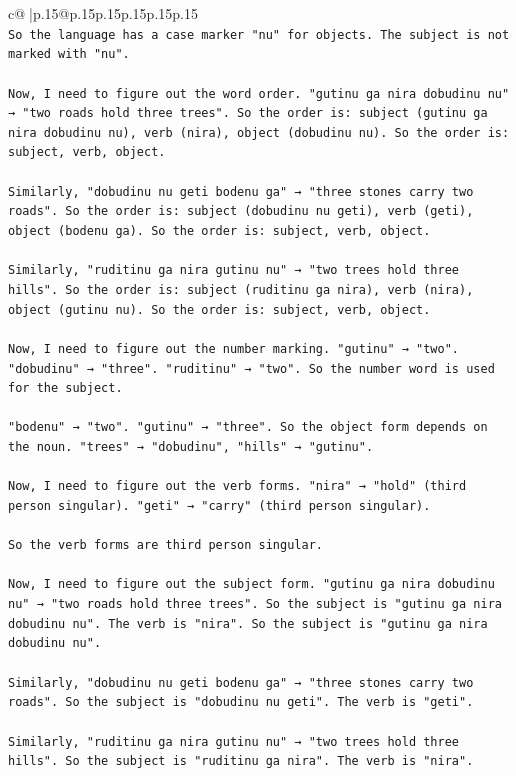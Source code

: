 \documentclass{article}
\begin{document}
{\begin{supertabular}{c@{$\;$}|p{.15\linewidth}@{}p{.15\linewidth}p{.15\linewidth}p{.15\linewidth}p{.15\linewidth}p{.15\linewidth}}
{{{\\ 
\texttt{So the language has a case marker "nu" for objects. The subject is not marked with "nu".} \\
\\ 
\texttt{Now, I need to figure out the word order. "gutinu ga nira dobudinu nu" → "two roads hold three trees". So the order is: subject (gutinu ga nira dobudinu nu), verb (nira), object (dobudinu nu). So the order is: subject, verb, object.} \\
\\ 
\texttt{Similarly, "dobudinu nu geti bodenu ga" → "three stones carry two roads". So the order is: subject (dobudinu nu geti), verb (geti), object (bodenu ga). So the order is: subject, verb, object.} \\
\\ 
\texttt{Similarly, "ruditinu ga nira gutinu nu" → "two trees hold three hills". So the order is: subject (ruditinu ga nira), verb (nira), object (gutinu nu). So the order is: subject, verb, object.} \\
\\ 
\texttt{Now, I need to figure out the number marking. "gutinu" → "two". "dobudinu" → "three". "ruditinu" → "two". So the number word is used for the subject.} \\
\\ 
\texttt{"bodenu" → "two". "gutinu" → "three". So the object form depends on the noun. "trees" → "dobudinu", "hills" → "gutinu".} \\
\\ 
\texttt{Now, I need to figure out the verb forms. "nira" → "hold" (third person singular). "geti" → "carry" (third person singular).} \\
\\ 
\texttt{So the verb forms are third person singular.} \\
\\ 
\texttt{Now, I need to figure out the subject form. "gutinu ga nira dobudinu nu" → "two roads hold three trees". So the subject is "gutinu ga nira dobudinu nu". The verb is "nira". So the subject is "gutinu ga nira dobudinu nu".} \\
\\ 
\texttt{Similarly, "dobudinu nu geti bodenu ga" → "three stones carry two roads". So the subject is "dobudinu nu geti". The verb is "geti".} \\
\\ 
\texttt{Similarly, "ruditinu ga nira gutinu nu" → "two trees hold three hills". So the subject is "ruditinu ga nira". The verb is "nira".} \\
}}}
\end{supertabular}}
\end{document}
